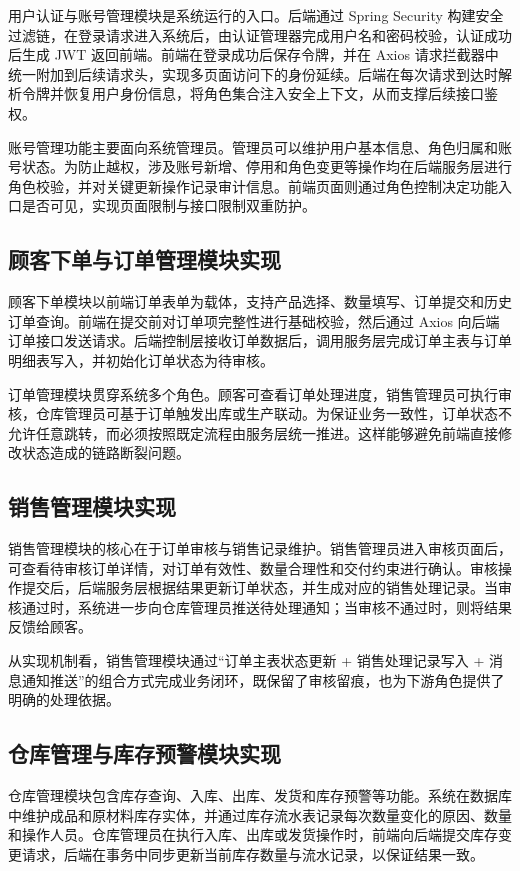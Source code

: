 用户认证与账号管理模块是系统运行的入口。后端通过 Spring Security 构建安全过滤链，在登录请求进入系统后，由认证管理器完成用户名和密码校验，认证成功后生成 JWT 返回前端。前端在登录成功后保存令牌，并在 Axios 请求拦截器中统一附加到后续请求头，实现多页面访问下的身份延续。后端在每次请求到达时解析令牌并恢复用户身份信息，将角色集合注入安全上下文，从而支撑后续接口鉴权。

账号管理功能主要面向系统管理员。管理员可以维护用户基本信息、角色归属和账号状态。为防止越权，涉及账号新增、停用和角色变更等操作均在后端服务层进行角色校验，并对关键更新操作记录审计信息。前端页面则通过角色控制决定功能入口是否可见，实现页面限制与接口限制双重防护。

\subsection{顾客下单与订单管理模块实现}

顾客下单模块以前端订单表单为载体，支持产品选择、数量填写、订单提交和历史订单查询。前端在提交前对订单项完整性进行基础校验，然后通过 Axios 向后端订单接口发送请求。后端控制层接收订单数据后，调用服务层完成订单主表与订单明细表写入，并初始化订单状态为待审核。

订单管理模块贯穿系统多个角色。顾客可查看订单处理进度，销售管理员可执行审核，仓库管理员可基于订单触发出库或生产联动。为保证业务一致性，订单状态不允许任意跳转，而必须按照既定流程由服务层统一推进。这样能够避免前端直接修改状态造成的链路断裂问题。

\subsection{销售管理模块实现}

销售管理模块的核心在于订单审核与销售记录维护。销售管理员进入审核页面后，可查看待审核订单详情，对订单有效性、数量合理性和交付约束进行确认。审核操作提交后，后端服务层根据结果更新订单状态，并生成对应的销售处理记录。当审核通过时，系统进一步向仓库管理员推送待处理通知；当审核不通过时，则将结果反馈给顾客。

从实现机制看，销售管理模块通过“订单主表状态更新 + 销售处理记录写入 + 消息通知推送”的组合方式完成业务闭环，既保留了审核留痕，也为下游角色提供了明确的处理依据。

\subsection{仓库管理与库存预警模块实现}

仓库管理模块包含库存查询、入库、出库、发货和库存预警等功能。系统在数据库中维护成品和原材料库存实体，并通过库存流水表记录每次数量变化的原因、数量和操作人员。仓库管理员在执行入库、出库或发货操作时，前端向后端提交库存变更请求，后端在事务中同步更新当前库存数量与流水记录，以保证结果一致。

